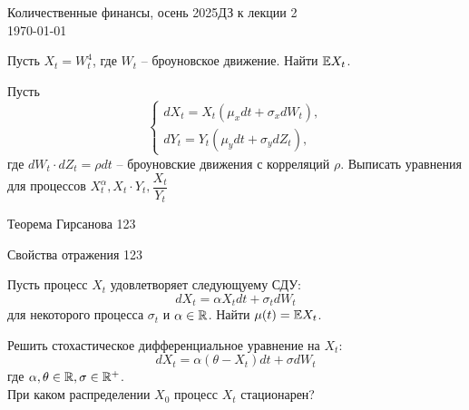 \documentclass[12pt]{article}
\begin{document}
\noindent Количественные финансы, осень 2025\hfill ДЗ к лекции 2\\
\today

\hrulefill

\begin{problem}
    Пусть $X_t = W_t^4$, где $W_t$ -- броуновское движение. Найти $\mathbb{E} X_t$. 
\end{problem}
    \begin{problem}
        Пусть
        $$\begin{cases}
            dX_t = X_t (\mu_x dt + \sigma_x dW_t), \\
            dY_t = Y_t (\mu_y dt + \sigma_y dZ_t),
        \end{cases}$$
        где $dW_t\cdot dZ_t = \rho dt$ -- броуновские движения с корреляций $\rho$. Выписать уравнения для процессов $X_t^{\alpha}, X_t \cdot Y_t, \dfrac{X_t}{Y_t}$
    \end{problem}
    \begin{problem}{Теорема Гирсанова}
        123
    \end{problem}

    \begin{problem}{Свойства отражения}
        123
    \end{problem}

    \begin{problem}
        Пусть процесс $X_t$ удовлетворяет следующуему СДУ:
        $$
            dX_t = \alpha X_t dt + \sigma_t dW_t
        $$для некоторого процесса $\sigma_t$ и $\alpha \in \mathbb{R}$. Найти $\mu(t)=\mathbb{E} X_t$.
    \end{problem}

    \begin{problem}
        Решить стохастическое дифференциальное уравнение на $X_t$:
        $$
            dX_t = \alpha (\theta -  X_t) dt + \sigma dW_t
        $$где $\alpha, \theta \in \mathbb{R}, \sigma \in \mathbb{R}^+$.
        \\
        При каком распределении $X_0$ процесс $X_t$ стационарен?
    \end{problem}
\end{document}
